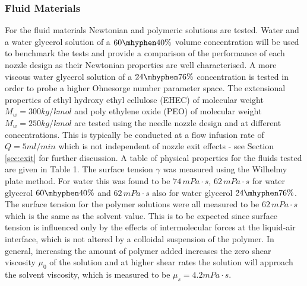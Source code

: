 \documentclass[11pt]{article}
\begin{document}
\subsubsection{Fluid Materials} \label{sec:materials}
For the fluid materials Newtonian and polymeric solutions are tested. Water and a water glycerol solution of a $60 \mhyphen 40 \%$ volume concentration will be used to benchmark the tests and provide a comparison of the performance of each nozzle design as their Newtonian properties are well characterised. A more viscous water glycerol solution of a $24 \mhyphen 76 \%$ concentration is tested in order to probe a higher Ohnesorge number parameter space. The extensional properties of ethyl hydroxy ethyl cellulose (EHEC) of molecular weight $M_w = 300 kg/kmol$ and poly ethylene oxide (PEO) of molecular weight $M_w = 250 kg/kmol$ are tested using the needle nozzle design and at different concentrations. This is typically be conducted at a flow infusion rate of $Q=5ml/min$ which is not independent of nozzle exit effects - see Section \ref{sec:exit} for further discussion. A table of physical properties for the fluids tested are given in Table 1. The surface tension $\gamma$ was measured using the Wilhelmy plate method. For water this was found to be $74 \, mPa \cdot s$, $62 \, mPa \cdot s$ for water glycerol $60 \mhyphen 40\%$  and $62 \, mPa \cdot s$ also for water glycerol $24 \mhyphen 76 \%$. The surface tension for the polymer solutions were all measured to be $62 \, mPa \cdot s$ which is the same as the solvent value. This is to be expected since surface tension is influenced only by the effects of intermolecular forces at the liquid-air interface, which is not altered by a colloidal suspension of the polymer. In general, increasing the amount of polymer added increases the zero shear viscosity $\mu_0$ of the solution and at higher shear rates the solution will approach the solvent viscosity, which is measured to be $\mu_{s} = 4.2 mPa \cdot s$.
\end{document}
